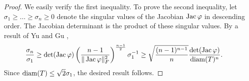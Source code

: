 \documentclass[10pt,letterpaper]{article}
\begin{document}
\begin{proof}
    We easily verify the first inequality. To prove the second inequality, let $\sigma_1 \geq \dots \geq \sigma_n \geq 0$ denote the singular values of the Jacobian $\operatorname{{\rm Jac}}\varphi$ in descending order.
    The Jacobian determinant is the product of these singular values. 
    By a result of Yu and Gu \cite{yisheng1997note},
    \begin{align*}
        \frac{ \sigma_{n} }{ \sigma_{1} }
        &\geq 
        \det(\operatorname{{\rm Jac}}\varphi)
        \left( \frac{n-1}{\|\operatorname{{\rm Jac}}\varphi\|_{F}^{2}} \right)^{\frac{n-1}{2}}
        \sigma_{1}^{-1}
        \geq 
        \sqrt{\frac{ (n-1)^{n-1} }{n} }
        \frac{ \det(\operatorname{{\rm Jac}}\varphi) }{ {\operatorname{diam}}(T)^{n} }
        .
    \end{align*}
    Since ${\operatorname{diam}}(T) \leq \sqrt{2} \sigma_{1}$, the desired result follows. 
\end{proof}
\end{document}
